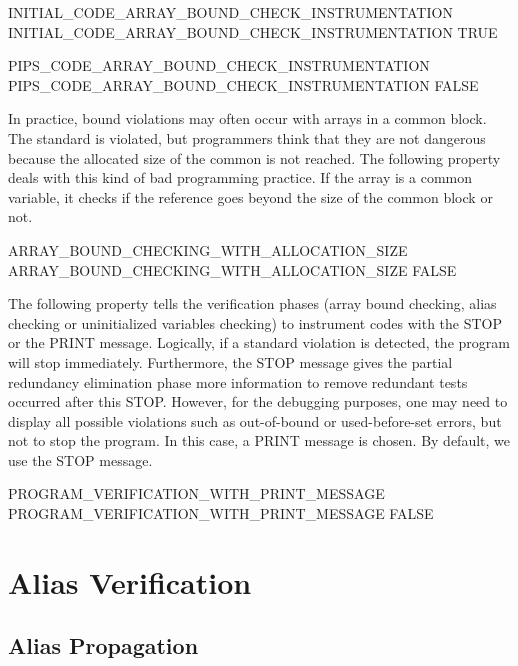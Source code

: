 \documentclass[a4paper]{report}
\begin{document}
\begin{PipsProp}{INITIAL_CODE_ARRAY_BOUND_CHECK_INSTRUMENTATION}
INITIAL_CODE_ARRAY_BOUND_CHECK_INSTRUMENTATION TRUE
\end{PipsProp}
\begin{PipsProp}{PIPS_CODE_ARRAY_BOUND_CHECK_INSTRUMENTATION}
PIPS_CODE_ARRAY_BOUND_CHECK_INSTRUMENTATION FALSE
\end{PipsProp}

In practice, bound violations may often occur with arrays in a common block. The
standard is violated, but programmers think that they are not dangerous
because the allocated size of the common is not reached.
The following property deals with this kind of bad programming practice. If the
array is a common variable, it checks if the reference goes beyond the
size of the common block or not.

\begin{PipsProp}{ARRAY_BOUND_CHECKING_WITH_ALLOCATION_SIZE}
ARRAY_BOUND_CHECKING_WITH_ALLOCATION_SIZE FALSE
\end{PipsProp}

The following property tells the verification phases (array bound
checking, alias checking or uninitialized variables checking) to instrument
codes with the STOP or the PRINT message. Logically, if a standard violation
is detected, the program will stop immediately. Furthermore, the STOP message gives the
partial redundancy elimination phase more information to remove
redundant tests occurred after this STOP. However, for the debugging
purposes, one may need to display all possible violations such as
out-of-bound or used-before-set errors, but not
to stop the program. In this case, a PRINT message is chosen. By default,
we use the STOP message.

\begin{PipsProp}{PROGRAM_VERIFICATION_WITH_PRINT_MESSAGE}
PROGRAM_VERIFICATION_WITH_PRINT_MESSAGE FALSE
\end{PipsProp}



\section{Alias Verification}
\label{subsection-alias-verification}

\subsection{Alias Propagation}
\label{subsubsection-alias-propagation}
\end{document}

